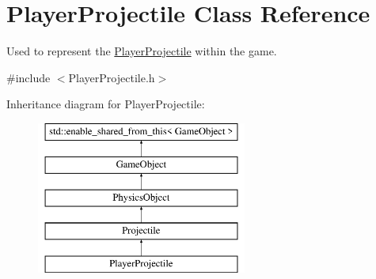 \hypertarget{class_player_projectile}{}\section{Player\+Projectile Class Reference}
\label{class_player_projectile}


Used to represent the \hyperlink{class_player_projectile}{Player\+Projectile} within the game.  




{\ttfamily \#include $<$Player\+Projectile.\+h$>$}

Inheritance diagram for Player\+Projectile\+:\begin{figure}[H]
\begin{center}
\leavevmode
\includegraphics[height=5.000000cm]{d5/df1/class_player_projectile}
\end{center}
\end{figure}

